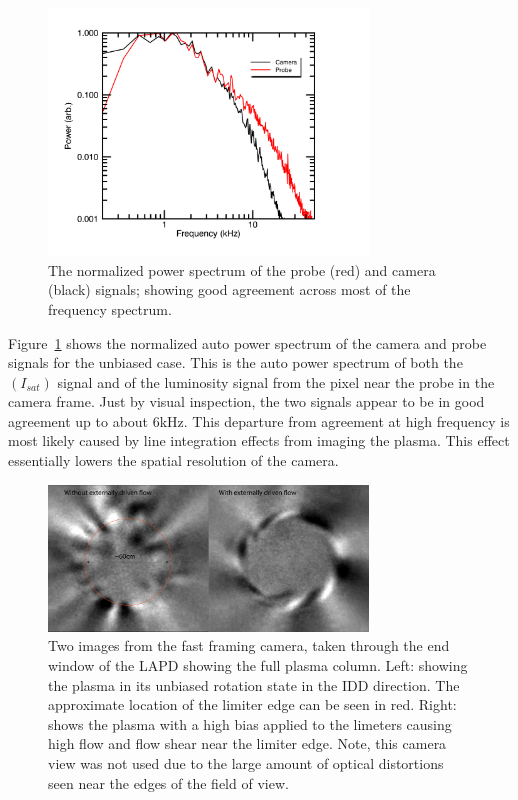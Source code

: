 \documentclass{jpp}
\begin{document}
\begin{figure}
\centerline{\includegraphics[width=8.5cm]{plot_Freq_spectra_cam_probe_bias_0V_23cm}}
\caption{The normalized power spectrum of the probe (red) and camera (black) signals; showing good agreement across most of the frequency spectrum. }
\label{fig:plot_Freq_spectra_cam_probe_bias_0V_23cm}
\end{figure}

Figure~\ref{fig:plot_Freq_spectra_cam_probe_bias_0V_23cm} shows the normalized auto power spectrum of the camera and probe signals for the unbiased case. This is the auto power spectrum of both the $(I_{sat})$ signal and of the luminosity signal from the pixel near the probe in the camera frame. Just by visual inspection, the two signals appear to be in good agreement up to about 6kHz.  This departure from agreement at high frequency is most likely caused by line integration effects from imaging the plasma. This effect essentially lowers the spatial resolution of the camera. 


\begin{figure}
\centerline{\includegraphics[width=8.5cm]{plot_camera_images_flow}}
\caption{Two images from the fast framing camera, taken through the end window of the LAPD showing the full plasma column. Left: showing the plasma in its unbiased rotation state in the IDD direction.  The approximate location of the limiter edge can be seen in red.  Right: shows the plasma with a high bias applied to the limeters causing high flow and flow shear near the limiter edge.  Note, this camera view was not used due to the large amount of optical distortions seen near the edges of the field of view.}
\label{fig:plot_camera_images_flow}
\end{figure}
\end{document}
